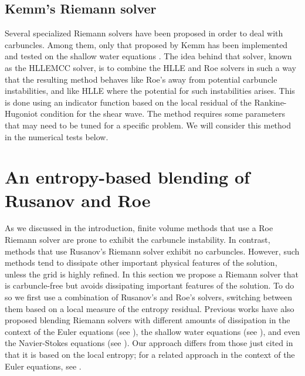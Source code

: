 \documentclass[preprint, 11pt]{article}
\begin{document}
\subsection{Kemm's Riemann solver} \label{sec:kemm}
Several specialized Riemann solvers have been proposed in order to deal
with carbuncles.  Among them, only that proposed by Kemm has been implemented
and tested on the shallow water equations \cite{kemm2014note,bader2014carbuncle}.
The idea behind that solver, known as the HLLEMCC solver, is to combine
the HLLE and Roe solvers in such a way that the resulting method behaves
like Roe's away from potential carbuncle instabilities, and like HLLE
where the potential for such instabilities arises.   This is done using
an indicator function based on the local residual of the Rankine-Hugoniot
condition for the shear wave.  The method requires some parameters that
may need to be tuned for a specific problem.  We will consider this method
in the numerical tests below.


\section{An entropy-based blending of Rusanov and Roe}\label{sec:blended_rs}

As we discussed in the introduction, finite volume methods that use a
Roe Riemann solver are prone to exhibit the carbuncle instability.
In contrast, methods that use Rusanov's Riemann solver exhibit no carbuncles. 
However, such methods tend to dissipate other important physical features of
the solution, unless the grid is highly refined.
In this section we propose a Riemann solver
that is carbuncle-free but avoids dissipating important features of the solution.
To do so we first use a combination of Rusanov's and Roe's solvers, switching
between them based on a local measure of the entropy residual.
Previous works have also proposed blending Riemann solvers with different
amounts of dissipation in the context of the Euler equations (see
\cite{nishikawa2008very,wang2016developing,jaisankar2007diffusion,ohwada2018simple,deng2019new,ray2013entropy}),
the shallow water equations (see \cite{bader2014carbuncle,kemm2014note}),
and even the Navier-Stokes equations (see \cite{nishikawa2008very,ohwada2018simple}).
Our approach differs from those just cited in that it is based on the local entropy;
for a related approach in the context of the Euler equations, see
\cite{ismail2009affordable,ismail2009proposed}.
\end{document}
